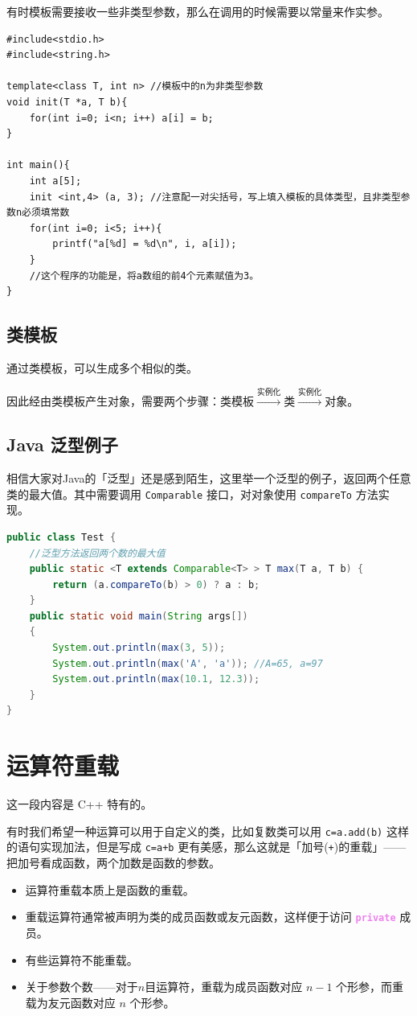 \documentclass[UTF8]{ctexart}
\newcommand\keyword[1]{\textcolor{violet}{\textbf{\texttt{#1}}}}
\begin{document}
有时模板需要接收一些非类型参数，那么在调用的时候需要以常量来作实参。

\begin{lstlisting}
#include<stdio.h>
#include<string.h>

template<class T, int n> //模板中的n为非类型参数
void init(T *a, T b){
    for(int i=0; i<n; i++) a[i] = b;
}

int main(){
	int a[5];
	init <int,4> (a, 3); //注意配一对尖括号，写上填入模板的具体类型，且非类型参数n必须填常数
	for(int i=0; i<5; i++){
		printf("a[%d] = %d\n", i, a[i]);
	}
	//这个程序的功能是，将a数组的前4个元素赋值为3。
}
\end{lstlisting}


\subsection{类模板}
通过类模板，可以生成多个相似的类。

因此经由类模板产生对象，需要两个步骤：$\text{类模板}\xrightarrow{\text{实例化}}\text{类}\xrightarrow{\text{实例化}} \text{对象}$。

\subsection{Java 泛型例子}
相信大家对Java的「泛型」还是感到陌生，这里举一个泛型的例子，返回两个任意类的最大值。其中需要调用 \verb!Comparable! 接口，对对象使用 \verb!compareTo! 方法实现。



\begin{lstlisting}[language=Java]
public class Test {
	//泛型方法返回两个数的最大值
	public static <T extends Comparable<T> > T max(T a, T b) {
		return (a.compareTo(b) > 0) ? a : b;
	}
	public static void main(String args[])
    {
        System.out.println(max(3, 5));
        System.out.println(max('A', 'a')); //A=65, a=97
        System.out.println(max(10.1, 12.3));
    }
}
\end{lstlisting}

\section{运算符重载}
这一段内容是 C++ 特有的。

有时我们希望一种运算可以用于自定义的类，比如复数类可以用 \verb!c=a.add(b)! 这样的语句实现加法，但是写成 \verb!c=a+b! 更有美感，那么这就是「加号(\verb!+!)的重载」——把加号看成函数，两个加数是函数的参数。

\begin{itemize}[itemsep=0pt,parsep=0pt]
  \item 运算符重载本质上是函数的重载。
  \item 重载运算符通常被声明为类的成员函数或友元函数，这样便于访问 \keyword{private} 成员。
  \item 有些运算符不能重载。
  \item 关于参数个数——对于$n$目运算符，重载为成员函数对应 $n-1$ 个形参，而重载为友元函数对应 $n$ 个形参。
\end{itemize}
\end{document}
